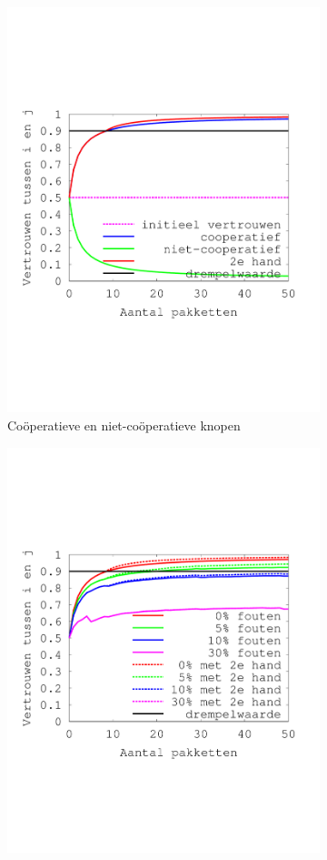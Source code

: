 \begin{figure}[ht]
\centering
\begin{subfigure}{.49\textwidth}
  \centering
  \includegraphics[width=.9\linewidth]{./resources/reputation-paper.pdf}
  \caption{Co\"operatieve en niet-co\"operatieve knopen}
  \label{fig:reputation-paper}
\end{subfigure}
\begin{subfigure}{.49\textwidth}
  \centering
  \includegraphics[width=.9\linewidth]{./resources/reputation-with-failure.pdf}

\end{subfigure}
\end{figure}
